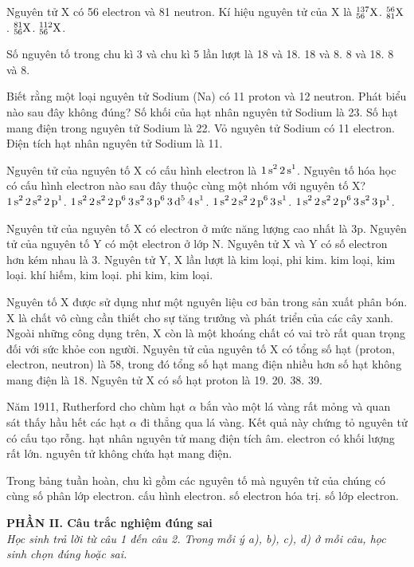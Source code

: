 \documentclass[11pt,a4paper]{article}
\begin{document}
\begin{ex}
Nguyên tử X có 56 electron và 81 neutron. Kí hiệu nguyên tử của X là
\choice
{$^{137}_{56}\ce{X}$.}
{$^{56}_{81}\ce{X}$.}
{$^{81}_{56}\ce{X}$.}
{$^{112}_{56}\ce{X}$.}
\end{ex}
\begin{ex}
Số nguyên tố trong chu kì 3 và chu kì 5 lần lượt là
\choice
{18 và 18.}
{18 và 8.}
{8 và 18.}
{8 và 8.}
\end{ex}
\begin{ex}
Biết rằng một loại nguyên tử Sodium (Na) có 11 proton và 12 neutron. Phát biểu nào sau đây không đúng?
\choice
{Số khối của hạt nhân nguyên tử Sodium là 23.}
{Số hạt mang điện trong nguyên tử Sodium là 22.}
{Vỏ nguyên tử Sodium có 11 electron.}
{Điện tích hạt nhân nguyên tử Sodium là 11.}
\end{ex}
\begin{ex}
Nguyên tử của nguyên tố X có cấu hình electron là $\ce{1s^2 2s^1}$. Nguyên tố hóa học có cấu hình electron nào sau đây thuộc cùng một nhóm với nguyên tố X?
\choice
{$\ce{1s^2 2s^2 2p^1}$.}
{$\ce{1s^2 2s^2 2p^6 3s^2 3p^6 3d^5 4s^1}$.}
{$\ce{1s^2 2s^2 2p^6 3s^1}$.}
{$\ce{1s^2 2s^2 2p^6 3s^2 3p^1}$.}
\end{ex}
\begin{ex}
Nguyên tử của nguyên tố X có electron ở mức năng lượng cao nhất là 3p. Nguyên tử của nguyên tố Y có một electron ở lớp N. Nguyên tử X và Y có số electron hơn kém nhau là 3. Nguyên tử Y, X lần lượt là
\choice
{kim loại, phi kim.}
{kim loại, kim loại.}
{khí hiếm, kim loại.}
{phi kim, kim loại.}
\end{ex}
\begin{ex}
Nguyên tố X được sử dụng như một nguyên liệu cơ bản trong sản xuất phân bón. X là chất vô cùng cần thiết cho sự tăng trưởng và phát triển của các cây xanh. Ngoài những công dụng trên, X còn là một khoáng chất có vai trò rất quan trọng đối với sức khỏe con người. Nguyên tử của nguyên tố X có tổng số hạt (proton, electron, neutron) là 58, trong đó tổng số hạt mang điện nhiều hơn số hạt không mang điện là 18. Nguyên tử X có số hạt proton là
\choice
{19.}
{20.}
{38.}
{39.}
\end{ex}
\begin{ex}
Năm 1911, Rutherford cho chùm hạt $\alpha$ bắn vào một lá vàng rất mỏng và quan sát thấy hầu hết các hạt $\alpha$ đi thẳng qua lá vàng. Kết quả này chứng tỏ
\choice
{nguyên tử có cấu tạo rỗng.}
{hạt nhân nguyên tử mang điện tích âm.}
{electron có khối lượng rất lớn.}
{nguyên tử không chứa hạt mang điện.}
\end{ex}
\begin{ex}
Trong bảng tuần hoàn, chu kì gồm các nguyên tố mà nguyên tử của chúng có cùng
\choice
{số phân lớp electron.}
{cấu hình electron.}
{số electron hóa trị.}
{số lớp electron.}
\end{ex}
\vspace{4pt}
\noindent
{\color{mainGreen}\textbf{\large PHẦN II. Câu trắc nghiệm đúng sai}}\\
\textit{\small Học sinh trả lời từ câu 1 đến câu 2. Trong mỗi ý a), b), c), d) ở mỗi câu, học sinh chọn đúng hoặc sai.}
\vspace{2pt}
\end{document}
